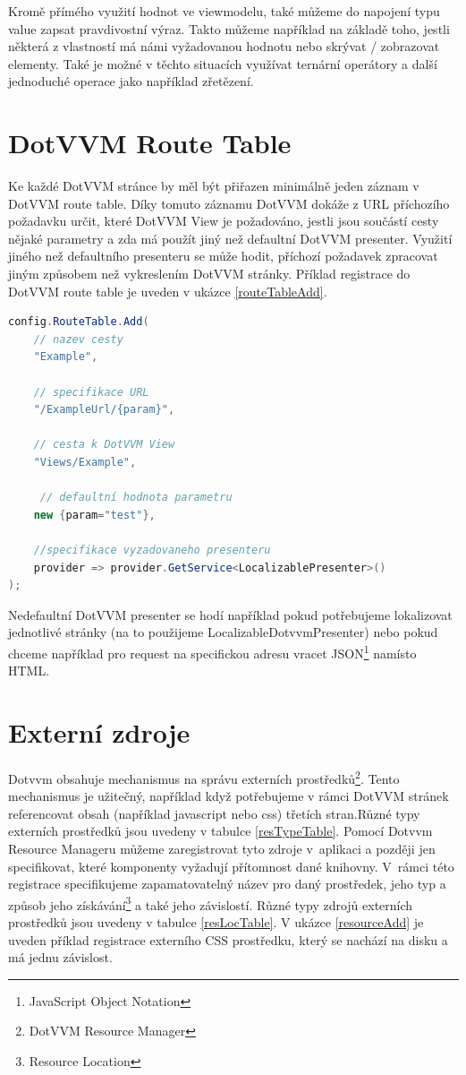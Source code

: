 Kromě přímého využití hodnot ve viewmodelu, také můžeme do napojení typu value zapsat pravdivostní výraz. Takto můžeme například na základě toho, jestli některá z vlastností má námi vyžadovanou hodnotu nebo skrývat / zobrazovat elementy. Také je možné v těchto situacích využívat ternární operátory a další jednoduché operace jako například zřetězení. 
\section{DotVVM Route Table}
Ke každé DotVVM stránce by měl být přiřazen minimálně jeden záznam v DotVVM route table\cite{DotVVM-Routing}. Díky tomuto záznamu DotVVM dokáže z URL příchozího požadavku určit, které DotVVM View je požadováno, jestli jsou součástí cesty nějaké parametry a zda má použít jiný než defaultní DotVVM presenter. Využití jiného než defaultního presenteru se může hodit, příchozí požadavek zpracovat jiným způsobem než vykreslením DotVVM stránky. Příklad registrace do DotVVM route table je uveden v ukázce \ref{routeTableAdd}.
\pagebreak
\begin{lstlisting}[language=C#, caption=Ukázka přidání záznamu do DotVVM route table v rámci DotvvmStartup.cs.,label=routeTableAdd,captionpos=t]
config.RouteTable.Add(
    // nazev cesty
    "Example",
    
    // specifikace URL
    "/ExampleUrl/{param}",
    
    // cesta k DotVVM View
    "Views/Example", 
    
     // defaultní hodnota parametru
    new {param="test"},
    
    //specifikace vyzadovaneho presenteru
    provider => provider.GetService<LocalizablePresenter>()
);
\end{lstlisting}

Nedefaultní DotVVM presenter se hodí například pokud potřebujeme lokalizovat jednotlivé stránky (na to použijeme LocalizableDotvvmPresenter) nebo pokud chceme například pro request na specifickou adresu vracet JSON\footnote{JavaScript Object Notation} namísto HTML.
\section{Externí zdroje}
Dotvvm obsahuje mechanismus na správu externích prostředků\footnote{DotVVM Resource Manager}. Tento mechanismus je užitečný, například když potřebujeme v rámci DotVVM stránek referencovat obsah (například javascript nebo css) třetích stran.Různé typy externích prostředků jsou uvedeny v tabulce \ref{resTypeTable}. Pomocí Dotvvm Resource Manageru můžeme zaregistrovat tyto zdroje v~aplikaci a později jen specifikovat, které komponenty vyžadují přítomnost dané knihovny. V~rámci této registrace specifikujeme zapamatovatelný název pro daný prostředek, jeho typ a způsob jeho získávání\footnote{ Resource Location } a také jeho závislostí. Různé typy zdrojů externích prostředků jsou uvedeny v tabulce \ref{resLocTable}.  V ukázce \ref{resourceAdd} je uveden příklad registrace externího CSS prostředku, který se nachází na disku a má jednu závislost.

